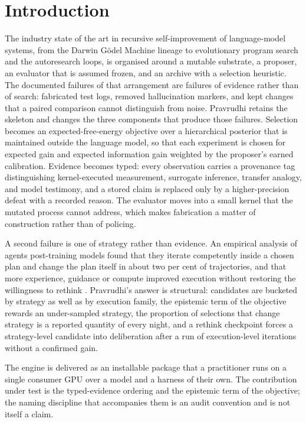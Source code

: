 \section{Introduction}
\label{sec:intro}

The industry state of the art in recursive self-improvement of language-model systems, from the Darwin G\"odel Machine lineage \citep{zhang2025dgm} to evolutionary program search and the autoresearch loops, is organised around a mutable substrate, a proposer, an evaluator that is assumed frozen, and an archive with a selection heuristic. The documented failures of that arrangement are failures of evidence rather than of search: fabricated test logs, removed hallucination markers, and kept changes that a paired comparison cannot distinguish from noise. Pravrudhi retains the skeleton and changes the three components that produce those failures. Selection becomes an expected-free-energy objective over a hierarchical posterior that is maintained outside the language model, so that each experiment is chosen for expected gain and expected information gain weighted by the proposer's earned calibration. Evidence becomes typed: every observation carries a provenance tag distinguishing kernel-executed measurement, surrogate inference, transfer analogy, and model testimony, and a stored claim is replaced only by a higher-precision defeat with a recorded reason. The evaluator moves into a small kernel that the mutated process cannot address, which makes fabrication a matter of construction rather than of policing.

A second failure is one of strategy rather than evidence. An empirical analysis of agents post-training models found that they iterate competently inside a chosen plan and change the plan itself in about two per cent of trajectories, and that more experience, guidance or compute improved execution without restoring the willingness to rethink \citep{tsinghua2026posttraining}. Pravrudhi's answer is structural: candidates are bucketed by strategy as well as by execution family, the epistemic term of the objective rewards an under-sampled strategy, the proportion of selections that change strategy is a reported quantity of every night, and a rethink checkpoint forces a strategy-level candidate into deliberation after a run of execution-level iterations without a confirmed gain.

The engine is delivered as an installable package that a practitioner runs on a single consumer GPU over a model and a harness of their own. The contribution under test is the typed-evidence ordering and the epistemic term of the objective; the naming discipline that accompanies them is an audit convention and is not itself a claim.
